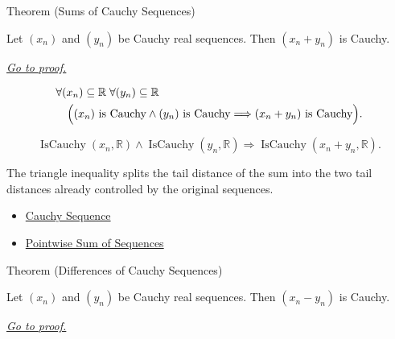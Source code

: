 \begin{theorembox}{Theorem (Sums of Cauchy Sequences)}
\begin{theorem}
\label{thm:sum-cauchy-sequences}
Let $(x_n)$ and $(y_n)$ be Cauchy real sequences. Then $(x_n+y_n)$ is
Cauchy.

\smallskip
\noindent
\hyperref[prf:sum-cauchy-sequences]{\textit{Go to proof.}}
\end{theorem}
\end{theorembox}

\begin{remark*}
\[
\begin{aligned}
&\forall (x_n)\subseteq\mathbb{R}\;\forall (y_n)\subseteq\mathbb{R}\\
&\quad
\Bigl(
  (x_n)\text{ is Cauchy}
  \land
  (y_n)\text{ is Cauchy}
  \Longrightarrow
  (x_n+y_n)\text{ is Cauchy}
\Bigr).
\end{aligned}
\]
\end{remark*}

\begin{remark*}
\[
\operatorname{IsCauchy}(x_n,\mathbb{R})
\land
\operatorname{IsCauchy}(y_n,\mathbb{R})
\Longrightarrow
\operatorname{IsCauchy}(x_n+y_n,\mathbb{R}).
\]
\end{remark*}

\begin{remark*}[Interpretation]
The triangle inequality splits the tail distance of the sum into the two tail
distances already controlled by the original sequences.
\end{remark*}

\begin{dependencies}
\begin{itemize}
  \item \hyperref[def:cauchy-sequence]{Cauchy Sequence}
  \item \hyperref[def:pointwise-sum-sequence]{Pointwise Sum of Sequences}
\end{itemize}
\end{dependencies}


\begin{theorembox}{Theorem (Differences of Cauchy Sequences)}
\begin{theorem}
\label{thm:difference-cauchy-sequences}
Let $(x_n)$ and $(y_n)$ be Cauchy real sequences. Then $(x_n-y_n)$ is
Cauchy.

\smallskip
\noindent
\hyperref[prf:difference-cauchy-sequences]{\textit{Go to proof.}}
\end{theorem}
\end{theorembox}

